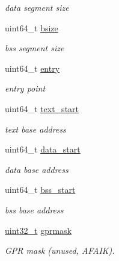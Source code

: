 \begin{DoxyCompactItemize}
\begin{DoxyCompactList}\small\item\em data segment size \item\end{DoxyCompactList}\item 
uint64\_\-t \hyperlink{structaout__exechdr_a3ab66d1b84a53d94cc37a352e2a6f924}{bsize}
\begin{DoxyCompactList}\small\item\em bss segment size \item\end{DoxyCompactList}\item 
uint64\_\-t \hyperlink{structaout__exechdr_a6aac0a1a7d70f8270f9bb1222445f370}{entry}
\begin{DoxyCompactList}\small\item\em entry point \item\end{DoxyCompactList}\item 
uint64\_\-t \hyperlink{structaout__exechdr_aa4eac899ae38f54555678e2254964222}{text\_\-start}
\begin{DoxyCompactList}\small\item\em text base address \item\end{DoxyCompactList}\item 
uint64\_\-t \hyperlink{structaout__exechdr_a5d7a0219354cefea542b0ea6263b2813}{data\_\-start}
\begin{DoxyCompactList}\small\item\em data base address \item\end{DoxyCompactList}\item 
uint64\_\-t \hyperlink{structaout__exechdr_ab48b1f7afd2111d3a58e3cd8fb2a93ed}{bss\_\-start}
\begin{DoxyCompactList}\small\item\em bss base address \item\end{DoxyCompactList}\item 
\hyperlink{Type_8hh_a435d1572bf3f880d55459d9805097f62}{uint32\_\-t} \hyperlink{structaout__exechdr_aaec57878eb2220f39252dd48feff6b8f}{gprmask}
\begin{DoxyCompactList}\small\item\em GPR mask (unused, AFAIK). \item\end{DoxyCompactList}\item 

\end{DoxyCompactItemize}
